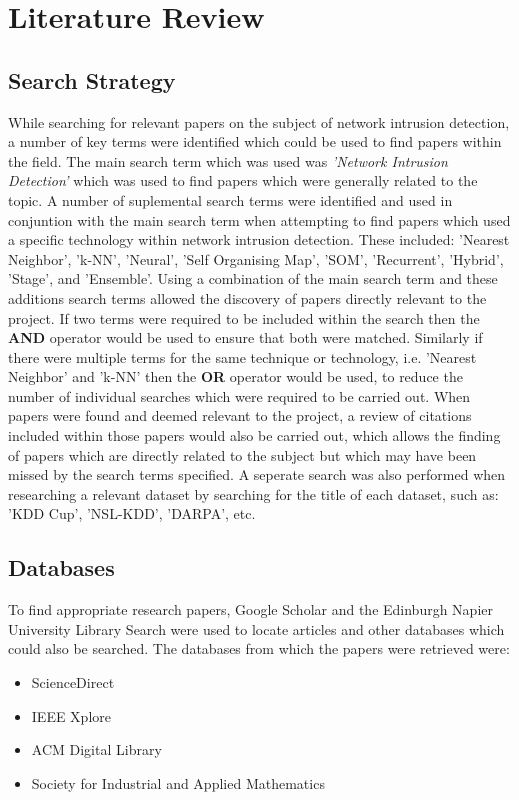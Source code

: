 \section{Literature Review}

	\subsection{Search Strategy}
While searching for relevant papers on the subject of network intrusion detection, a number of key terms were identified which could be used to find papers within the field. The main search term which was used was \textit{'Network Intrusion Detection'} which was used to find papers which were generally related to the topic. A number of suplemental search terms were identified and used in conjuntion with the main search term when attempting to find papers which used a specific technology within network intrusion detection. These included: 'Nearest Neighbor', 'k-NN', 'Neural', 'Self Organising Map', 'SOM', 'Recurrent', 'Hybrid', 'Stage', and 'Ensemble'. Using a combination of the main search term and these additions search terms allowed the discovery of papers directly relevant to the project. If two terms were required to be included within the search then the \textbf{AND} operator would be used to ensure that both were matched. Similarly if there were multiple terms for the same technique or technology, i.e. 'Nearest Neighbor' and 'k-NN' then the \textbf{OR} operator would be used, to reduce the number of individual searches which were required to be carried out. When papers were found and deemed relevant to the project, a review of citations included within those papers would also be carried out, which allows the finding of papers which are directly related to the subject but which may have been missed by the search terms specified. A seperate search was also performed when researching a relevant dataset by searching for the title of each dataset, such as: 'KDD Cup', 'NSL-KDD', 'DARPA', etc. 

	\subsection{Databases}
		To find appropriate research papers, Google Scholar and the Edinburgh Napier University Library Search were used to locate articles and other databases which could also be searched. The databases from which the papers were retrieved were:
		\begin{itemize}
			\item ScienceDirect
			\item IEEE Xplore
			\item ACM Digital Library
			\item Society for Industrial and Applied Mathematics
		\end{itemize}
		
